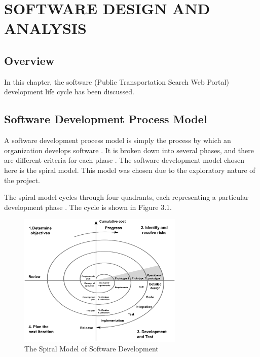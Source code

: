 
\chapter{SOFTWARE DESIGN AND ANALYSIS} %



\ifpdf
    \graphicspath{{3/figures/PNG/}{3/figures/PDF/}{3/figures/}}
\else
    \graphicspath{{3/figures/EPS/}{3/figures/}}
\fi

\section{Overview}
In this chapter, the software (Public Transportation Search Web Portal) development life cycle has been discussed.

\section{Software Development Process Model}
A software development process model is simply the process by which an organization 
develops software \citep{mayo_software_2016}. It is broken down into several phases, and there are different criteria for each phase \citep{marciniak1994encyclopedia}. The software development model chosen here is the spiral model. This model was chosen due to the exploratory nature of the project.

The spiral model cycles through four quadrants, each representing a particular development phase \cite{boehm_spiral_1988}. The cycle is shown in Figure 3.1.

\begin{figure}[th!]
	\centering
	\includegraphics[width=0.7\textwidth]{spiral}
	\caption[The Spiral Model of Software Development]{The Spiral Model of Software Development \citep{boehm_spiral_1988}}
	\label{fig:spiral}
\end{figure}

